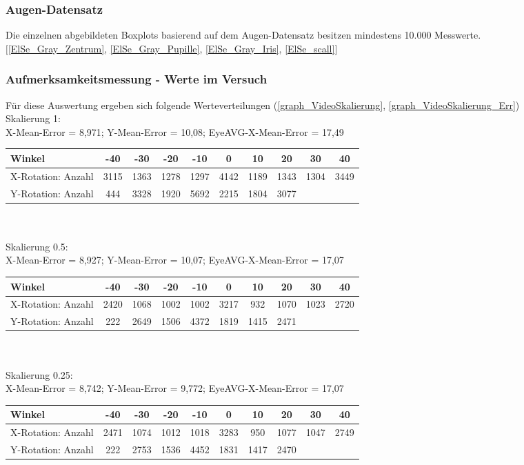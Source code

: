 \subsubsection*{Augen-Datensatz \cite{database_Eye}}
Die einzelnen abgebildeten Boxplots basierend auf dem Augen-Datensatz \cite{database_Eye} besitzen mindestens 10.000 Messwerte.\\
$[$\autoref{ElSe_Gray_Zentrum}, \autoref{ElSe_Gray_Pupille}, \autoref{ElSe_Gray_Iris}, \autoref{ElSe_scall}$]$
\subsubsection*{Aufmerksamkeitsmessung - Werte im Versuch}
Für diese Auswertung ergeben sich folgende Werteverteilungen (\autoref{graph_VideoSkalierung}, \autoref{graph_VideoSkalierung_Err})\\
Skalierung 1:\\
X-Mean-Error = 8,971; Y-Mean-Error = 10,08; EyeAVG-X-Mean-Error = 17,49\\
\begin{tabular}{|l|c|c|c|c|c|c|c|c|c|}
	\hline 
	Winkel&-40&-30&-20&-10&0&10&20&30&40\\
	\hline 
	X-Rotation: Anzahl&3115&1363&1278&1297&4142&1189&1343&1304&3449\\ 
	\hline 
	Y-Rotation: Anzahl&444&3328&1920&5692&2215&1804&3077&&\\
	\hline
\end{tabular}\\\\
Skalierung 0.5:\\
X-Mean-Error = 8,927; Y-Mean-Error = 10,07; EyeAVG-X-Mean-Error = 17,07\\
\begin{tabular}{|l|c|c|c|c|c|c|c|c|c|}
	\hline 
	Winkel&-40&-30&-20&-10&0&10&20&30&40\\
	\hline 
	X-Rotation: Anzahl&2420&1068&1002&1002&3217&932&1070&1023&2720\\ 
	\hline 
	Y-Rotation: Anzahl&222&2649&1506&4372&1819&1415&2471&&\\
	\hline
\end{tabular}\\\\
Skalierung 0.25:\\
X-Mean-Error = 8,742; Y-Mean-Error = 9,772; EyeAVG-X-Mean-Error = 17,07\\
\begin{tabular}{|l|c|c|c|c|c|c|c|c|c|}
\hline 
Winkel&-40&-30&-20&-10&0&10&20&30&40\\
\hline 
X-Rotation: Anzahl&2471&1074&1012&1018&3283&950&1077&1047&2749\\ 
\hline 
Y-Rotation: Anzahl&222&2753&1536&4452&1831&1417&2470&&\\
\hline
\end{tabular}\\\\
